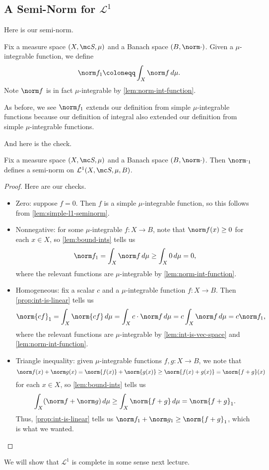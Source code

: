 \documentclass[../notes.tex]{subfiles}
\begin{document}
\subsection{A Semi-Norm for \texorpdfstring{$\mathcal L^1$}{ L1}}
Here is our semi-norm.
\begin{notation}
	Fix a measure space $(X,\mc S,\mu)$ and a Banach space $(B,\norm\cdot)$. Given a $\mu$-integrable function, we define
	\[\norm f_1\coloneqq\int_X\norm f\,d\mu.\]
	Note $\norm f$ is in fact $\mu$-integrable by \autoref{lem:norm-int-function}.
\end{notation}
\begin{remark}
	As before, we see $\norm f_1$ extends our definition from simple $\mu$-integrable functions because our definition of integral also extended our definition from simple $\mu$-integrable functions.
\end{remark}
And here is the check.
\begin{corollary} \label{cor:l1-seminorm}
	Fix a measure space $(X,\mc S,\mu)$ and a Banach space $(B,\norm\cdot)$. Then $\norm\cdot_1$ defines a semi-norm on $\mathcal L^1(X,\mc S,\mu,B)$.
\end{corollary}
\begin{proof}
	Here are our checks.
	\begin{itemize}
		\item Zero: suppose $f=0$. Then $f$ is a simple $\mu$-integrable function, so this follows from \autoref{lem:simple-l1-seminorm}.
		\item Nonnegative: for some $\mu$-integrable $f\colon X\to B$, note that $\norm f(x)\ge0$ for each $x\in X$, so \autoref{lem:bound-ints} tells us
		\[\norm f_1=\int_X\norm f\,d\mu\ge\int_X0\,d\mu=0,\]
		where the relevant functions are $\mu$-integrable by \autoref{lem:norm-int-function}.
		\item Homogeneous: fix a scalar $c$ and a $\mu$-integrable function $f\colon X\to B$. Then \autoref{prop:int-is-linear} tells us
		\[\norm{cf}_1=\int_X\norm{cf}\,d\mu=\int_Xc\cdot\norm f\,d\mu=c\int_X\norm f\,d\mu=c\norm f_1,\]
		where the relevant functions are $\mu$-integrable by \autoref{lem:int-is-vec-space} and \autoref{lem:norm-int-function}.
		\item Triangle inequality: given $\mu$-integrable functions $f,g\colon X\to B$, we note that
		\[\norm f(x)+\norm g(x)=\norm{f(x)}+\norm{g(x)}\ge\norm{f(x)+g(x)}=\norm{f+g}(x)\]
		for each $x\in X$, so \autoref{lem:bound-ints} tells us
		\[\int_X(\norm f+\norm g)\,d\mu\ge\int_X\norm{f+g}\,d\mu=\norm{f+g}_1.\]
		Thus, \autoref{prop:int-is-linear} tells us $\norm f_1+\norm g_1\ge\norm{f+g}_1$, which is what we wanted.
		\qedhere
	\end{itemize}
\end{proof}
We will show that $\mathcal L^1$ is complete in some sense next lecture.
\end{document}
